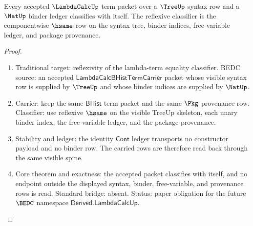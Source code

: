 \begin{theorem}
\label{thm:lambdacalc-carrier-reflexive}
Every accepted $\LambdaCalcUp$ term packet over a $\TreeUp$ syntax row and a
$\NatUp$ binder ledger classifies with itself. The reflexive classifier is the
componentwise $\hsame$ row on the syntax tree, binder indices, free-variable
ledger, and package provenance.
\end{theorem}
\begin{proof}
\begin{enumerate}
\item Traditional target: reflexivity of the lambda-term equality classifier.
BEDC source: an accepted $\mathsf{LambdaCalcBHistTermCarrier}$ packet whose
visible syntax row is supplied by $\TreeUp$ and whose binder indices are
supplied by $\NatUp$.

\item Carrier: keep the same $\mathsf{BHist}$ term packet and the same
$\Pkg$ provenance row. Classifier: use reflexive $\hsame$ on the visible
TreeUp skeleton, each unary binder index, the free-variable ledger, and the
package provenance.

\item Stability and ledger: the identity $\mathsf{Cont}$ ledger transports no
constructor payload and no binder row. The carried rows are therefore read back
through the same visible spine.

\item Core theorem and exactness: the accepted packet classifies with itself,
and no endpoint outside the displayed syntax, binder, free-variable, and
provenance rows is read. Standard bridge: absent. Status: paper obligation for
the future $\BEDC$ namespace $\mathsf{Derived.LambdaCalcUp}$.
\end{enumerate}
\end{proof}

